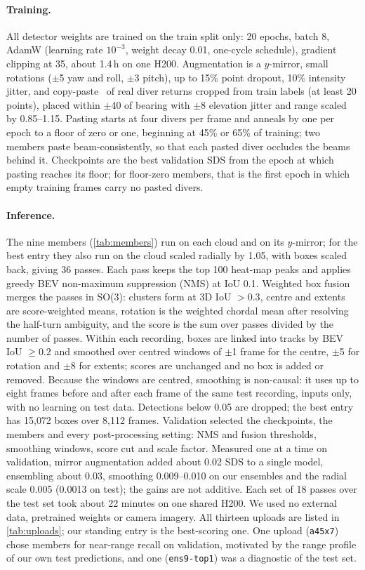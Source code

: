 \documentclass[10pt,twocolumn,letterpaper]{article}
\newcommand{\sds}{\mbox{SDS}}
\begin{document}
\paragraph{Training.}
All detector weights are trained on the train split only: 20 epochs, batch 8, AdamW (learning rate $10^{-3}$, weight decay 0.01, one-cycle schedule), gradient clipping at 35, about 1.4\,h on one H200.
Augmentation is a $y$-mirror, small rotations ($\pm$5\textdegree{} yaw and roll, $\pm$3\textdegree{} pitch), up to 15\% point dropout, 10\% intensity jitter, and copy-paste~\cite{second2018} of real diver returns cropped from train labels (at least 20 points), placed within $\pm$40\textdegree{} of bearing with $\pm$8\textdegree{} elevation jitter and range scaled by 0.85--1.15.
Pasting starts at four divers per frame and anneals by one per epoch to a floor of zero or one, beginning at 45\% or 65\% of training; two members paste beam-consistently, so that each pasted diver occludes the beams behind it.
Checkpoints are the best validation \sds{} from the epoch at which pasting reaches its floor; for floor-zero members, that is the first epoch in which empty training frames carry no pasted divers.

\paragraph{Inference.}
The nine members (\cref{tab:members}) run on each cloud and on its $y$-mirror; for the best entry they also run on the cloud scaled radially by 1.05, with boxes scaled back, giving 36 passes.
Each pass keeps the top 100 heat-map peaks and applies greedy BEV non-maximum suppression (NMS) at IoU 0.1.
Weighted box fusion~\cite{wbf2021} merges the passes in SO(3): clusters form at 3D IoU $>0.3$, centre and extents are score-weighted means, rotation is the weighted chordal mean after resolving the half-turn ambiguity, and the score is the sum over passes divided by the number of passes.
Within each recording, boxes are linked into tracks by BEV IoU $\ge 0.2$ and smoothed over centred windows of $\pm$1 frame for the centre, $\pm$5 for rotation and $\pm$8 for extents; scores are unchanged and no box is added or removed.
Because the windows are centred, smoothing is non-causal: it uses up to eight frames before and after each frame of the same test recording, inputs only, with no learning on test data.
Detections below 0.05 are dropped; the best entry has 15{,}072 boxes over 8{,}112 frames.
Validation selected the checkpoints, the members and every post-processing setting: NMS and fusion thresholds, smoothing windows, score cut and scale factor.
Measured one at a time on validation, mirror augmentation added about 0.02 \sds{} to a single model, ensembling about 0.03, smoothing 0.009--0.010 on our ensembles and the radial scale 0.005 (0.0013 on test); the gains are not additive.
Each set of 18 passes over the test set took about 22 minutes on one shared H200.
We used no external data, pretrained weights or camera imagery.
All thirteen uploads are listed in \cref{tab:uploads}; our standing entry is the best-scoring one.
One upload (\texttt{a45x7}) chose members for near-range recall on validation, motivated by the range profile of our own test predictions, and one (\texttt{ens9-top1}) was a diagnostic of the test set.
\end{document}
